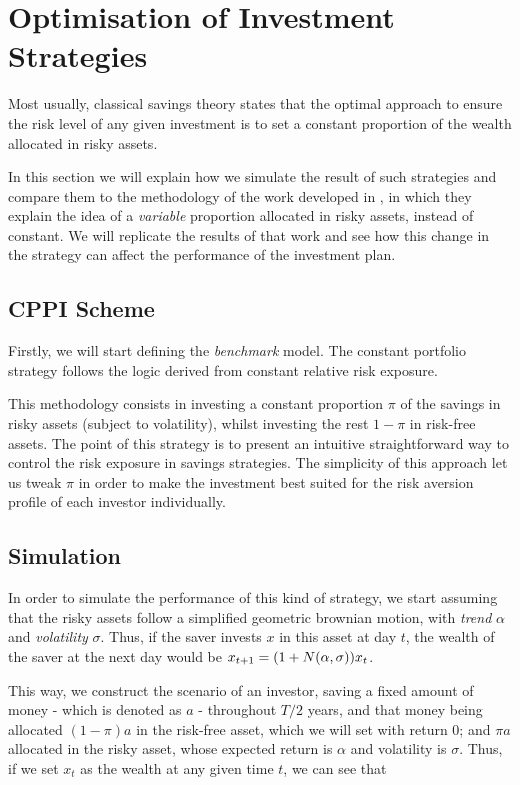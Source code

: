\section{Optimisation of Investment Strategies}

Most usually, classical savings theory states that the optimal approach to ensure the risk level of any given investment is to set a constant proportion of the wealth allocated in risky assets.

In this section we will explain how we simulate the result of such strategies and compare them to the methodology of the work developed in \cite{a:guillen-optimisation}, in which they explain the idea of a \emph{variable} proportion allocated in risky assets, instead of constant. We will replicate the results of that work and see how this change in the strategy can affect the performance of the investment plan.

\subsection{CPPI Scheme}

Firstly, we will start defining the \textit{benchmark} model. The constant portfolio strategy follows the logic derived from constant relative risk exposure.

This methodology consists in investing a constant proportion $\pi$ of the savings in risky assets (subject to volatility), whilst investing the rest $1 - \pi$ in risk-free assets. The point of this strategy is to present an intuitive straightforward way to control the risk exposure in savings strategies. The simplicity of this approach let us tweak $\pi$ in order to make the investment best suited for the risk aversion profile of each investor individually.

\subsection*{Simulation}

In order to simulate the performance of this kind of strategy, we start assuming that the risky assets follow a simplified geometric brownian motion, with \emph{trend} $\alpha$ and \emph{volatility} $\sigma$. Thus, if the saver invests $x$ in this asset at day $t$, the wealth of the saver at the next day would be $x_{t+1} = (1 + N\qty(\alpha, \sigma)) x_t$.

This way, we construct the scenario of an investor, saving a fixed amount of money - which is denoted as $a$ -   throughout $T/2$ years, and that money being allocated $( 1 - \pi) a$ in the risk-free asset, which we will set with return 0; and $\pi a$ allocated in the risky asset, whose expected return is $\alpha$ and volatility is $\sigma$. Thus, if we set $x_t$ as the wealth at any given time $t$, we can see that

